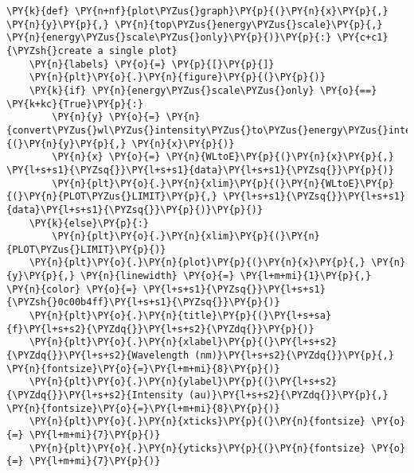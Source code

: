 \begin{tcolorbox}[breakable, size=fbox, boxrule=1pt, pad at break*=1mm,colback=cellbackground, colframe=cellborder]
\begin{Verbatim}[commandchars=\\\{\}]
\PY{k}{def} \PY{n+nf}{plot\PYZus{}graph}\PY{p}{(}\PY{n}{x}\PY{p}{,} \PY{n}{y}\PY{p}{,} \PY{n}{top\PYZus{}energy\PYZus{}scale}\PY{p}{,} \PY{n}{energy\PYZus{}scale\PYZus{}only}\PY{p}{)}\PY{p}{:} \PY{c+c1}{\PYZsh{}create a single plot}
    \PY{n}{labels} \PY{o}{=} \PY{p}{[}\PY{p}{]}
    \PY{n}{plt}\PY{o}{.}\PY{n}{figure}\PY{p}{(}\PY{p}{)}
    \PY{k}{if} \PY{n}{energy\PYZus{}scale\PYZus{}only} \PY{o}{==} \PY{k+kc}{True}\PY{p}{:}
        \PY{n}{y} \PY{o}{=} \PY{n}{convert\PYZus{}wl\PYZus{}intensity\PYZus{}to\PYZus{}energy\PYZus{}intensity}\PY{p}{(}\PY{n}{y}\PY{p}{,} \PY{n}{x}\PY{p}{)}
        \PY{n}{x} \PY{o}{=} \PY{n}{WLtoE}\PY{p}{(}\PY{n}{x}\PY{p}{,} \PY{l+s+s1}{\PYZsq{}}\PY{l+s+s1}{data}\PY{l+s+s1}{\PYZsq{}}\PY{p}{)}
        \PY{n}{plt}\PY{o}{.}\PY{n}{xlim}\PY{p}{(}\PY{n}{WLtoE}\PY{p}{(}\PY{n}{PLOT\PYZus{}LIMIT}\PY{p}{,} \PY{l+s+s1}{\PYZsq{}}\PY{l+s+s1}{data}\PY{l+s+s1}{\PYZsq{}}\PY{p}{)}\PY{p}{)}
    \PY{k}{else}\PY{p}{:}
        \PY{n}{plt}\PY{o}{.}\PY{n}{xlim}\PY{p}{(}\PY{n}{PLOT\PYZus{}LIMIT}\PY{p}{)}
    \PY{n}{plt}\PY{o}{.}\PY{n}{plot}\PY{p}{(}\PY{n}{x}\PY{p}{,} \PY{n}{y}\PY{p}{,} \PY{n}{linewidth} \PY{o}{=} \PY{l+m+mi}{1}\PY{p}{,} \PY{n}{color} \PY{o}{=} \PY{l+s+s1}{\PYZsq{}}\PY{l+s+s1}{\PYZsh{}0c00b4ff}\PY{l+s+s1}{\PYZsq{}}\PY{p}{)}
    \PY{n}{plt}\PY{o}{.}\PY{n}{title}\PY{p}{(}\PY{l+s+sa}{f}\PY{l+s+s2}{\PYZdq{}}\PY{l+s+s2}{\PYZdq{}}\PY{p}{)}
    \PY{n}{plt}\PY{o}{.}\PY{n}{xlabel}\PY{p}{(}\PY{l+s+s2}{\PYZdq{}}\PY{l+s+s2}{Wavelength (nm)}\PY{l+s+s2}{\PYZdq{}}\PY{p}{,} \PY{n}{fontsize}\PY{o}{=}\PY{l+m+mi}{8}\PY{p}{)}
    \PY{n}{plt}\PY{o}{.}\PY{n}{ylabel}\PY{p}{(}\PY{l+s+s2}{\PYZdq{}}\PY{l+s+s2}{Intensity (au)}\PY{l+s+s2}{\PYZdq{}}\PY{p}{,}  \PY{n}{fontsize}\PY{o}{=}\PY{l+m+mi}{8}\PY{p}{)}
    \PY{n}{plt}\PY{o}{.}\PY{n}{xticks}\PY{p}{(}\PY{n}{fontsize} \PY{o}{=} \PY{l+m+mi}{7}\PY{p}{)}
    \PY{n}{plt}\PY{o}{.}\PY{n}{yticks}\PY{p}{(}\PY{n}{fontsize} \PY{o}{=} \PY{l+m+mi}{7}\PY{p}{)}
    

\end{Verbatim}
\end{tcolorbox}
